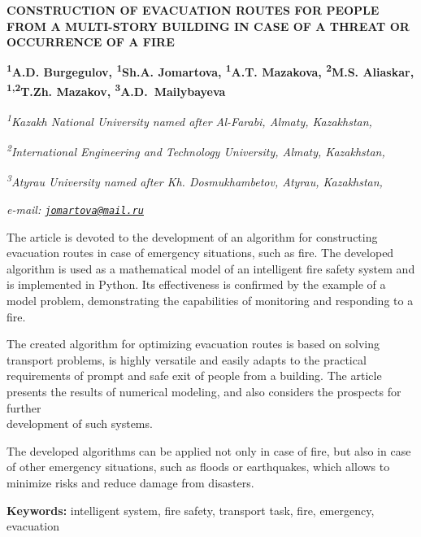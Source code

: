 \begin{articleheader}
{\bfseries CONSTRUCTION OF EVACUATION ROUTES FOR PEOPLE FROM A MULTI-STORY BUILDING IN CASE OF A THREAT OR OCCURRENCE OF A FIRE}

{\bfseries
\textsuperscript{1}A.D. Burgegulov,
\textsuperscript{1}Sh.A. Jomartova\textsuperscript{\envelope },
\textsuperscript{1}A.T. Mazakova,
\textsuperscript{2}M.S. Aliaskar,
\textsuperscript{1,2}T.Zh. Mazakov,
\textsuperscript{3}A.D.~Mailybayeva}
\end{articleheader}

\begin{affiliation}
\emph{\textsuperscript{1}Kazakh National University named after Al-Farabi, Almaty, Kazakhstan,}

\emph{\textsuperscript{2}International Engineering and Technology University, Almaty, Kazakhstan,}

\emph{\textsuperscript{3}Atyrau University named after Kh. Dosmukhambetov, Atyrau, Kazakhstan,}

\emph{e-mail: \href{mailto:jomartova@mail.ru}{\nolinkurl{jomartova@mail.ru}}}
\end{affiliation}

The article is devoted to the development of an algorithm for
constructing evacuation routes in case of emergency situations, such as
fire. The developed algorithm is used as a mathematical model of an
intelligent fire safety system and is implemented in Python. Its
effectiveness is confirmed by the example of a model problem,
demonstrating the capabilities of monitoring and responding to a fire.

The created algorithm for optimizing evacuation routes is based on
solving transport problems, is highly versatile and easily adapts to the
practical requirements of prompt and safe exit of people from a
building. The article presents the results of numerical modeling, and
also considers the prospects for further \\development of such systems.

The developed algorithms can be applied not only in case of fire, but
also in case of other emergency situations, such as floods or
earthquakes, which allows to minimize risks and reduce damage from
disasters.

{\bfseries Keywords:} intelligent system, fire safety, transport task, fire,
emergency, evacuation

